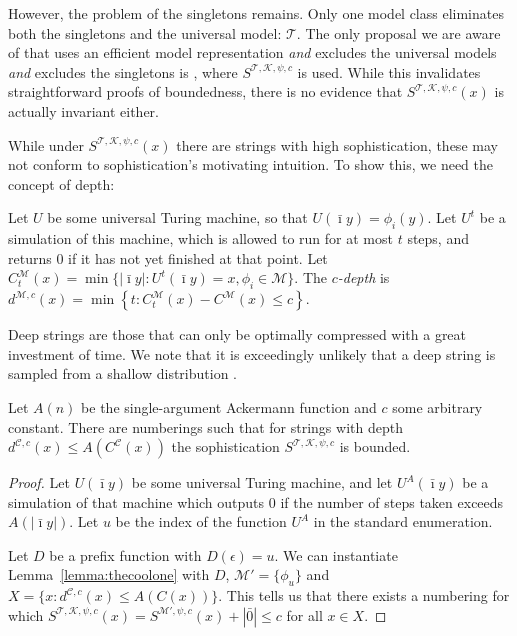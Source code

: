 \documentclass{style/llncs}
\newcommand{\M}{\mathscr M}
\newcommand{\C}{\mathscr C}
\newcommand{\T}{\mathscr T}
\newcommand{\K}{\mathscr K}
\newcommand{\s}{S}
\begin{document}
However, the problem of the singletons remains. Only one model class eliminates both the singletons and the universal model: $\T$. The only proposal we are aware of that uses an efficient model representation \emph{and} excludes the universal models \emph{and} excludes the singletons is \cite{vitanyi2004meaningful}, where $\s^{\T,\K,\psi,c}$ is used. While this invalidates straightforward proofs of boundedness, there is no evidence that $S^{\T,\K,\psi, c}(x)$ is actually invariant either.

While under $S^{\T,\K,\psi, c}(x)$ there are strings with high sophistication, these may not conform to sophistication's motivating intuition. To show this, we need the concept of depth:

\begin{definition}\belowdisplayskip=-12pt
Let $U$ be some universal Turing machine, so that $U(\bar\imath y) = \phi_i(y)$. Let $U^t$ be a simulation of this machine, which is allowed to run for at most $t$ steps, and returns $0$ if it has not yet finished at that point. Let $C^\M_t(x) = \min\{|\bar\imath y| : U^t(\bar\imath y) = x, \phi_i \in \M\}$. The \emph{$c$-depth} is $d^{\M,c}(x) = \min \left\{t : C^\M_t(x) - C^\M(x) \leq c \right\}$.
\end{definition}
Deep strings are those that can only be optimally compressed with a great investment of time. We note that it is exceedingly unlikely that a deep string is sampled from a shallow distribution \cite{bloem2014safe,bennett1988logical}. 
 
\begin{theorem}
Let $A(n)$ be the single-argument Ackermann function and $c$ some arbitrary constant. There are numberings such that for strings with depth $d^{\C,c}(x) \leq A(C^\C(x))$ the sophistication $\s^{\T, \K, \psi, c}$ is bounded.\label{thm:depth}
\end{theorem}

\begin{proof}
Let $U(\bar\imath y)$ be some universal Turing machine, and let $U^A(\bar\imath y)$ be a simulation of that machine which outputs $0$ if the number of steps taken exceeds $A(|\bar\imath y|)$. Let $u$ be the index of the function $U^A$ in the standard enumeration.

Let $D$ be a prefix function with $D(\epsilon) = u$. We can instantiate Lemma~\ref{lemma:thecoolone} with $D$, $\M' = \{\phi_u\}$ and $X = \{x : d^{\C,c}(x) \leq A(C(x))\}$. This tells us that there exists a numbering for which $\s^{\T, \K,\psi,c}(x) = \s^{\M', \psi, c}(x) + |\bar0| \leq c$ for all $x \in X$.
\end{proof}
\end{document}
